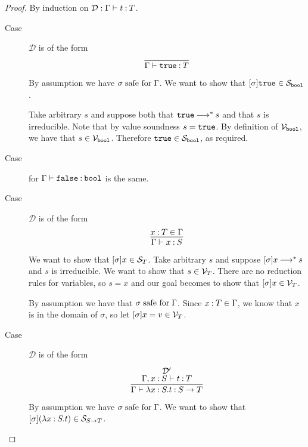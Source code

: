 \documentclass[11pt,letterpaper]{article}
\newcommand{\bool}{\mathtt{bool}}
\begin{document}
\begin{proof}
  By induction on $\mathcal{D} : \Gamma \proves t \hastype T$.
  \begin{description}
    \item[Case] $\mathcal{D}$ is of the form
      \begin{equation*}
        \infer{\Gamma \proves \true \hastype T}{}
      \end{equation*}

      By assumption we have $\sigma \safefor \Gamma$.
      We want to show that $[\sigma]\true \in \S_\bool$.

      Take arbitrary $s$ and suppose both that $\true \evalto^* s$ and that
      $s$ is irreducible.
      Note that by value soundness $s = \true$.
      By definition of $\V_\bool$, we have that $s \in \V_\bool$.
      Therefore $\true \in \S_\bool$, as required.

    \item[Case] for $\Gamma \proves \false \hastype \bool$ is the same.

    \item[Case] $\mathcal{D}$ is of the form
      \begin{equation*}
        \infer{\Gamma \proves x \hastype S}{x \hastype T \in \Gamma}
      \end{equation*}

      We want to show that $[\sigma]x \in \S_T$.
      Take arbitrary $s$ and suppose $[\sigma]x \evalto^* s$
      and $s$ is irreducible.
      We want to show that $s \in \V_T$.
      There are no reduction rules for variables, so $s = x$ and our goal
      becomes to show that $[\sigma]x \in \V_T$.

      By assumption we have that $\sigma \safefor \Gamma$.
      Since $x \hastype T \in \Gamma$, we know that $x$ is in the domain of
      $\sigma$, so let $[\sigma]x = v \in \V_T$.

    \item[Case] $\mathcal{D}$ is of the form
      \renewcommand{\t}{\ensuremath{\lambda x \hastype S . t}}
      \begin{equation*}
        \infer{\Gamma \proves \t \hastype S \to T}{
          \deduce[\mathcal{D}^\prime]{
            \Gamma, x \hastype S \proves t \hastype T
          }{}
        }
      \end{equation*}

      By assumption we have $\sigma \safefor \Gamma$.
      We want to show that
      $[\sigma](\t) \in \S_{S \to T}$.


\end{description}
\end{proof}
\end{document}
